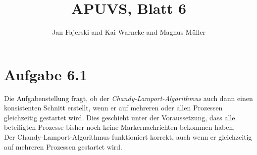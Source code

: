 \documentclass[a4paper,
12pt,
BCOR12mm,
]{scrartcl}
\title{APUVS, Blatt 6}
\author{Jan Fajerski and Kai Warncke and Magnus Müller}
\begin{document}

\maketitle 

\section*{Aufgabe 6.1}
Die Aufgabenstellung fragt, ob der \emph{Chandy-Lamport-Algorithmus} auch dann einen
konsistenten Schnitt erstellt, wenn er auf mehreren oder allen Prozessen gleichzeitig
gestartet wird. Dies geschieht unter der Voraussetzung, dass alle beteiligten Prozesse
bisher noch keine Markernachrichten bekommen haben. \\

Der Chandy-Lamport-Algorithmus funktioniert korrekt, auch wenn er gleichzeitig auf
mehreren Prozessen gestartet wird. \\
\end{document}
